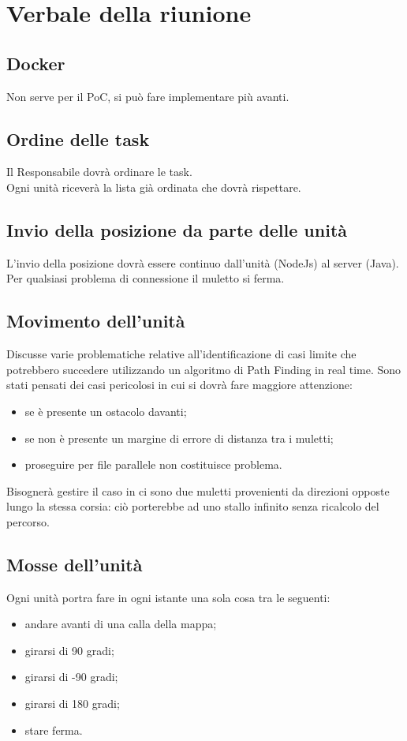 \section{Verbale della riunione}

\subsection {Docker}
Non serve per il PoC, si può fare implementare più avanti.

\subsection{Ordine delle task}
Il Responsabile dovrà ordinare le task.\\
Ogni unità riceverà la lista già ordinata che dovrà rispettare.

\subsection{Invio della posizione da parte delle unità}
L'invio della posizione dovrà essere continuo dall'unità (NodeJs) al server (Java).\\
Per qualsiasi problema di connessione il muletto si ferma.\\

\subsection{Movimento dell'unità}
Discusse varie problematiche relative all'identificazione di casi limite che potrebbero succedere utilizzando un algoritmo di Path Finding in real time. Sono stati pensati dei casi pericolosi in cui si dovrà fare maggiore attenzione:
\begin{itemize}
	\item se è presente un ostacolo davanti;
	\item se non è presente un margine di errore di distanza tra i muletti;
	\item proseguire per file parallele non costituisce problema.
\end{itemize}
Bisognerà gestire il caso in ci sono due muletti provenienti da direzioni opposte lungo la stessa corsia: ciò porterebbe ad uno stallo infinito senza ricalcolo del percorso.

\subsection{Mosse dell'unità}
Ogni unità portra fare in ogni istante una sola cosa tra le seguenti:
\begin{itemize}
	\item andare avanti di una calla della mappa;
	\item girarsi di 90 gradi;
	\item girarsi di -90 gradi;
	\item girarsi di 180 gradi;
	\item stare ferma.
\end{itemize}

